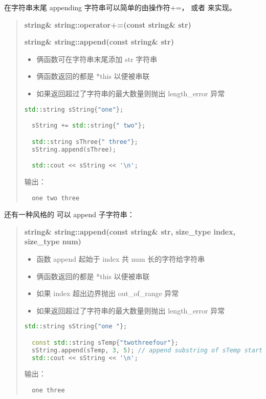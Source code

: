 \documentclass[../../LearnCpp.tex]{subfiles}
\begin{document}

在字符串末尾 appending 字符串可以简单的由操作符+=，  或者  来实现。

\begin{quotation}
  \textbf{string\& string::operator+=(const string\& str)}

  \textbf{string\& string::append(const string\& str)}

  \begin{itemize}
    \item 俩函数可在字符串末尾添加 str 字符串
    \item 俩函数返回的都是 *this 以便被串联
    \item 如果返回超过了字符串的最大数量则抛出 length\_error 异常
  \end{itemize}

  \begin{lstlisting}[language=C++]
  std::string sString{"one"};

  sString += std::string{" two"};

  std::string sThree{" three"};
  sString.append(sThree);

  std::cout << sString << '\n';
  \end{lstlisting}

  输出：

  \begin{lstlisting}
  one two three
  \end{lstlisting}
\end{quotation}

还有一种风格的  可以 append 子字符串：

\begin{quotation}
  \textbf{string\& string::append(const string\& str, size\_type index, size\_type num)}

  \begin{itemize}
    \item 函数 append 起始于 index 共 num 长的字符给字符串
    \item 俩函数返回的都是 *this 以便被串联
    \item 如果 index 超出边界抛出 out\_of\_range 异常
    \item 如果返回超过了字符串的最大数量则抛出 length\_error 异常
  \end{itemize}

  \begin{lstlisting}[language=C++]
  std::string sString{"one "};

  const std::string sTemp{"twothreefour"};
  sString.append(sTemp, 3, 5); // append substring of sTemp starting at index 3 of length 5
  std::cout << sString << '\n';
  \end{lstlisting}

  输出：

  \begin{lstlisting}
  one three
  \end{lstlisting}
\end{quotation}
\end{document}
